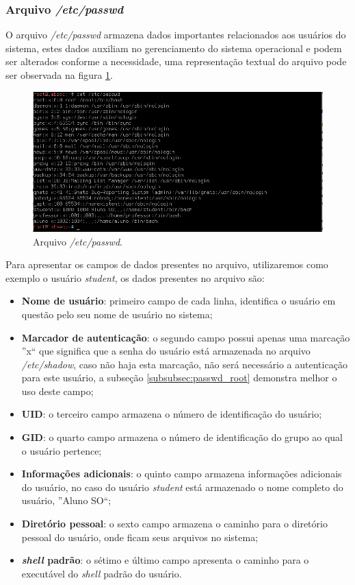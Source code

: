 \documentclass[
	12pt,				%
	oneside,   	        %
	a4paper,			%
	english,			%
	french,				%
	spanish,			%
	brazil,				%
	]{pacotes/abntex2}
\begin{document}
\subsubsection{Arquivo \textit{/etc/passwd}}
O arquivo \textit{/etc/passwd} armazena dados importantes relacionados aos usuários do sistema, estes dados auxiliam no gerenciamento do sistema operacional e podem ser alterados conforme a necessidade, uma representação textual do arquivo pode ser observada na figura \ref{fig:passwd}. 

\begin{figure}[H]
  \centering
  \includegraphics[scale=0.7]{figuras/passwd.png}
  \caption{Arquivo \textit{/etc/passwd}.}
  \label{fig:passwd}
\end{figure}

Para apresentar os campos de dados presentes no arquivo, utilizaremos como exemplo o usuário \textit{student}, os dados presentes no arquivo são:

\begin{itemize}
    \item \textbf{Nome de usuário}: primeiro campo de cada linha, identifica o usuário em questão pelo seu nome de usuário no sistema;
    \item \textbf{Marcador de autenticação}: o segundo campo possui apenas uma marcação ''x`` que significa que a senha do usuário está armazenada no arquivo \textit{/etc/shadow}, caso não haja esta marcação, não será necessário a autenticação para este usuário, a subseção \ref{subsubsec:passwd_root} demonstra melhor o uso deste campo;
    \item \textbf{UID}: o terceiro campo armazena o número de identificação do usuário;
    \item \textbf{GID}: o quarto campo armazena o número de identificação do grupo ao qual o usuário pertence;
    \item \textbf{Informações adicionais}: o quinto campo armazena informações adicionais do usuário, no caso do usuário \textit{student} está armazenado o nome completo do usuário, ''Aluno SO``;
    \item \textbf{Diretório pessoal}: o sexto campo armazena o caminho para o diretório pessoal do usuário, onde ficam seus arquivos no sistema;
    \item \textbf{\textit{shell} padrão}: o sétimo e último campo apresenta o caminho para o executável do \textit{shell} padrão do usuário.
\end{itemize}
\end{document}
